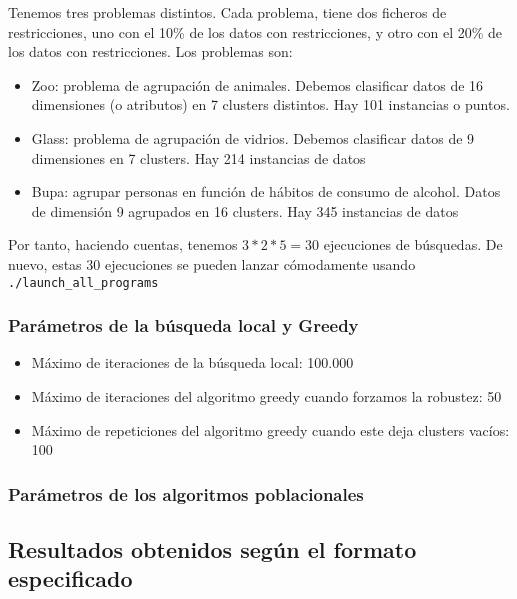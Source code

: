 \documentclass[11pt]{article}
\begin{document}
Tenemos tres problemas distintos. Cada problema, tiene dos ficheros de restricciones, uno con el 10\% de los datos con restricciones, y otro con el 20\% de los datos con restricciones. Los problemas son:

\begin{itemize}
    \item Zoo: problema de agrupación de animales. Debemos clasificar datos de 16 dimensiones (o atributos) en 7 clusters distintos. Hay 101 instancias o puntos.
    \item Glass: problema de agrupación de vidrios. Debemos clasificar datos de 9 dimensiones en 7 clusters. Hay 214 instancias de datos
    \item Bupa: agrupar personas en función de hábitos de consumo de alcohol. Datos de dimensión 9 agrupados en 16 clusters. Hay 345 instancias de datos
\end{itemize}

Por tanto, haciendo cuentas, tenemos $3 * 2 * 5 = 30$ ejecuciones de búsquedas. De nuevo, estas 30 ejecuciones se pueden lanzar cómodamente usando \lstinline{./launch_all_programs}

\subsubsection{Parámetros de la búsqueda local y Greedy}

\begin{itemize}
    \item Máximo de iteraciones de la búsqueda local: 100.000
    \item Máximo de iteraciones del algoritmo greedy cuando forzamos la robustez: 50
    \item Máximo de repeticiones del algoritmo greedy cuando este deja clusters vacíos: 100
\end{itemize}

\subsubsection{Parámetros de los algoritmos poblacionales}


\pagebreak

\subsection{Resultados obtenidos según el formato especificado}
\end{document}
